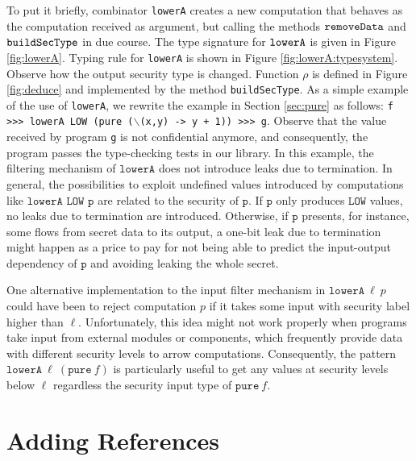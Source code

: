 \documentclass[times, 10pt,twocolumn]{article}
\begin{document}
To put it briefly, combinator \texttt{lowerA} 
creates a new computation that behaves as 
the computation received as argument, but 
calling the methods $\mathtt{removeData}$ and $\mathtt{buildSecType}$ in due
course. The type signature for $\mathtt{lowerA}$ is given in 
Figure \ref{fig:lowerA}. 
%
Typing rule for \texttt{lowerA} is shown in Figure
\ref{fig:lowerA:typesystem}. 
Observe how the output security type is changed. 
Function $\rho$ is defined in Figure \ref{fig:deduce} and implemented
by the method  \texttt{buildSecType}. %
As a simple example of the use of \texttt{lowerA},
we rewrite the example in Section \ref{sec:pure}
as follows: 
\texttt{f >>> lowerA LOW (pure ($\backslash$(x,y) -> y + 1)) >>> g}.
Observe that the value received by program \texttt{g} is not confidential
anymore, and consequently, the program passes the type-checking tests 
in our library. 
In this example, the filtering mechanism of $\texttt{lowerA}$ 
does not introduce leaks due to termination. 
In general, the possibilities to exploit undefined values introduced by 
computations like ${\texttt{lowerA LOW p}}$ are related to the security of $\texttt{p}$. 
If ${\texttt{p}}$ only produces $\texttt{LOW}$ values, no leaks due to termination 
are introduced. Otherwise, if $\texttt{p}$ presents, for instance, some
flows from secret data to its output, a one-bit leak due to termination might happen
as a price to pay for not being able to predict the input-output
dependency of $\texttt{p}$ and avoiding leaking the whole secret. 


One alternative implementation to the input filter mechanism in
$\texttt{lowerA}~\ell~p$ 
could have been to reject computation $p$ if it takes some input with security
label higher than $\ell$. Unfortunately, this idea might not work
properly when programs take input from external modules or
components, which frequently provide data with different security
levels to arrow computations. Consequently, the pattern
$\texttt{lowerA}~\ell~(\texttt{pure}~f)$ is particularly 
useful to get any values at security levels below $\ell$ 
regardless the security input type of $\texttt{pure}~f$. 



 

\section{Adding References} \label{sec:adding-references}
\end{document}
